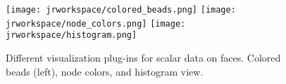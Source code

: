 \documentclass[Thesis.tex]{subfiles}
\begin{document}
\begin{figure}
	\centering
	\texttt{[image: jrworkspace/colored\_beads.png]}
	\texttt{[image: jrworkspace/node\_colors.png]}
	\texttt{[image: jrworkspace/histogram.png]}
	\caption[Visualizers]{Different visualization plug-ins for scalar data on faces. Colored beads (left),
		node colors, and histogram view.}
	\label{fig:visualizers}
\end{figure}

\subfilebibliography
\end{document}
